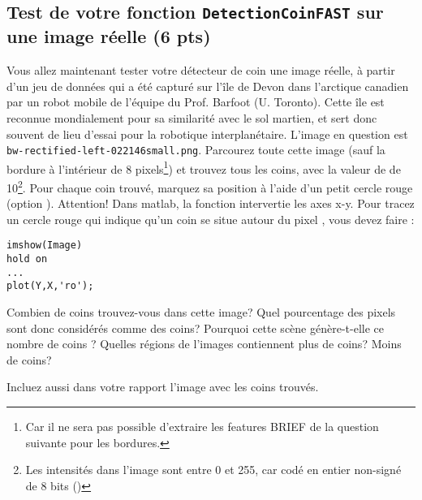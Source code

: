 \documentclass[12pt]{article}
\begin{document}
\subsection{Test de votre fonction \texttt{DetectionCoinFAST} sur une image réelle (6 pts)}
Vous allez maintenant tester votre détecteur de coin une image réelle, à partir d'un jeu de données qui a été capturé sur l'île de Devon dans l'arctique canadien par un robot mobile de l'équipe du Prof. Barfoot (U. Toronto). Cette île est reconnue mondialement pour sa similarité avec le sol martien, et sert donc souvent de lieu d'essai pour la robotique interplanétaire. L'image en question est \texttt{bw-rectified-left-022146small.png}. Parcourez toute cette image (sauf la bordure à l'intérieur de 8 pixels\footnote{Car il ne sera pas possible d'extraire les features BRIEF de la question suivante pour les bordures.}) et trouvez tous les coins, avec la valeur de  de 10\footnote{Les intensités dans l'image sont entre 0 et 255, car codé en entier non-signé de 8 bits ()}. Pour chaque coin trouvé, marquez sa position à l'aide d'un petit cercle rouge (option ). Attention! Dans matlab, la fonction  intervertie les axes x-y. Pour tracez un cercle rouge qui indique qu'un coin se situe autour du pixel , vous devez faire :
\vspace{-0.22in}
\begin{lstlisting}
imshow(Image)
hold on
...
plot(Y,X,'ro');
\end{lstlisting}
Combien de coins trouvez-vous dans cette image? Quel pourcentage des pixels sont donc considérés comme des coins? Pourquoi cette scène génère-t-elle ce nombre de coins ? Quelles régions de l'images contiennent plus de coins? Moins de coins? 

Incluez aussi dans votre rapport l'image avec les coins trouvés.


\end{document}
